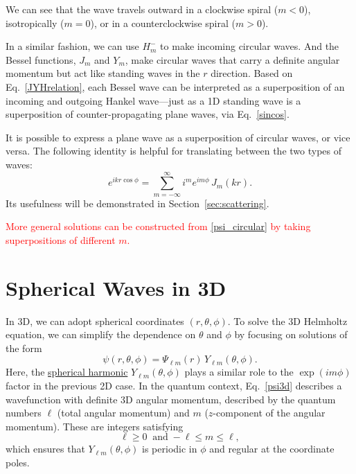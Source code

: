 \documentclass[pra,12pt]{revtex4-2}
\begin{document}
\noindent
We can see that the wave travels outward in a clockwise spiral ($m <
0$), isotropically ($m = 0$), or in a counterclockwise spiral ($m >
0$).

In a similar fashion, we can use $H_m^-$ to make incoming circular
waves.  And the Bessel functions, $J_m$ and $Y_m$, make circular waves
that carry a definite angular momentum but act like standing waves in
the $r$ direction.  Based on Eq.~\eqref{JYHrelation}, each Bessel wave
can be interpreted as a superposition of an incoming and outgoing
Hankel wave---just as a 1D standing wave is a superposition of
counter-propagating plane waves, via Eq.~\eqref{sincos}.

It is possible to express a plane wave as a superposition of circular
waves, or vice versa.  The following identity is helpful for
translating between the two types of waves:
\begin{equation}
  e^{ikr\cos\phi} = \sum_{m=-\infty}^\infty i^m e^{im\phi} \, J_m(kr).
  \label{eikrcosphi}
\end{equation}
Its usefulness will be demonstrated in Section~\ref{sec:scattering}.

\textcolor{red}{More general solutions can be constructed from
\eqref{psi_circular} by taking superpositions of different $m$.}

\section{Spherical Waves in 3D}
\label{sec:spherical}

In 3D, we can adopt spherical coordinates $(r, \theta, \phi)$.  To
solve the 3D Helmholtz equation, we can simplify the dependence on
$\theta$ and $\phi$ by focusing on solutions of the form
\begin{equation}
  \psi(r,\theta,\phi) = \Psi_{\ell m}(r) \,Y_{\ell m}(\theta, \phi).
  \label{psi3d}
\end{equation}
Here, the
\href{https://docs.scipy.org/doc/scipy/reference/generated/scipy.special.sph_harm.html}{spherical
  harmonic} $Y_{\ell m}(\theta,\phi)$ plays a similar role to the
$\exp(im\phi)$ factor in the previous 2D case.  In the quantum
context, Eq.~\eqref{psi3d} describes a wavefunction with definite 3D
angular momentum, described by the quantum numbers $\ell$ (total
angular momentum) and $m$ ($z$-component of the angular momentum).
These are integers satisfying
\begin{equation}
  \ell \ge 0 \;\;\mathrm{and}\; -\ell\le m \le \ell,
\end{equation}
which ensures that $Y_{\ell m}(\theta,\phi)$ is periodic in $\phi$ and
regular at the coordinate poles.
\end{document}
